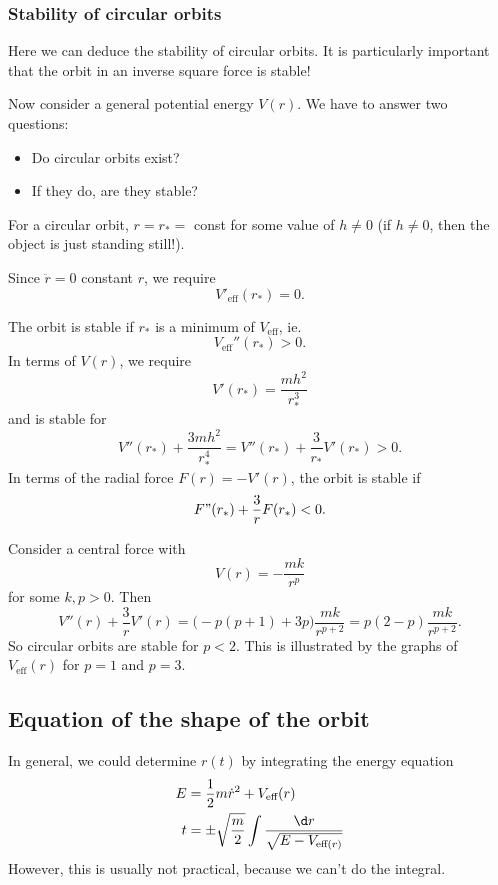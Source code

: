 \documentclass[a4paper]{article}
\begin{document}
\subsubsection{Stability of circular orbits}
Here we can deduce the stability of circular orbits. It is particularly important that the orbit in an inverse square force is stable!

Now consider a general potential energy $V(r)$. We have to answer two questions:
\begin{itemize}
  \item Do circular orbits exist?
  \item If they do, are they stable?
\end{itemize}

For a circular orbit, $r = r_* =$ const for some value of $h\not= 0$ (if $h\not = 0$, then the object is just standing still!).

Since $\ddot{r} = 0$ constant $r$, we require
\[
  V'_{\text{eff}}(r_*) = 0.
\]

The orbit is stable if $r_*$ is a minimum of $V_{\text{eff}}$, ie.
\[
  V_{\text{eff}}''(r_*) > 0.
\]
In terms of $V(r)$, we require
\[
  V'(r_*) = \frac{mh^2}{r_*^3}
\]
and is stable for
\[
  V''(r_*) + \frac{3mh^2}{r_*^4} = V''(r_*) + \frac{3}{r_*}V'(r_*) > 0.
\]
In terms of the radial force $F(r) = -V'(r)$, the orbit is stable if
\[
  F"(r_*) + \frac{3}{r}F(r_*) < 0.
\]
\begin{eg}
  Consider a central force with
  \[
    V(r) = -\frac{mk}{r^p}
  \]
  for some $k, p > 0$. Then
  \[
    V''(r) + \frac{3}{r}V'(r) = \big( -p(p + 1) + 3p\big)\frac{mk}{r^{p + 2}} = p(2-p)\frac{mk}{r^{p + 2}}.
  \]
  So circular orbits are stable for $p < 2$. This is illustrated by the graphs of $V_{\text{eff}}(r)$ for $p = 1$ and $p = 3$. 
  \begin{center}
  \end{center}
\end{eg}

\subsection{Equation of the shape of the orbit}
In general, we could determine $r(t)$ by integrating the energy equation
\begin{align*}
  E &= \frac{1}{2}m\dot{r}^2 + V_{\text{eff}}(r)\\
  t &= \pm \sqrt{\frac{m}{2}}\int \frac{\d r}{\sqrt{E - V_{\text{eff}(r)}}}
\end{align*}
However, this is usually not practical, because we can't do the integral.
\end{document}
